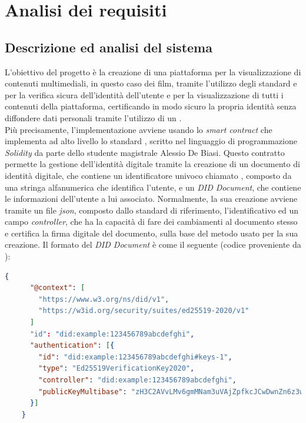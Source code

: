 \chapter{Analisi dei requisiti}
\label{cap:analisi-requisiti}


\section{Descrizione ed analisi del sistema}
L'obiettivo del progetto è la creazione di una piattaforma per la visualizzazione di contenuti multimediali, in questo caso dei film,
tramite l'utilizzo degli standard   e  per la verifica sicura dell'identità dell'utente e per la 
visualizzazione di tutti i contenuti della piattaforma, certificando in modo sicuro la propria identità senza diffondere dati personali tramite 
l'utilizzo di un .\\

Più precisamente, l'implementazione avviene usando lo \textit{smart contract} che implementa ad alto livello lo standard , 
scritto nel linguaggio di programmazione \textit{Solidity} da parte dello studente magistrale Alessio De Biasi.
Questo contratto permette la gestione dell'identità digitale tramite la creazione di un documento di identità digitale, che contiene un identificatore univoco
chiamato , composto da una stringa alfanumerica che identifica l'utente, e un \textit{DID Document}, che contiene le informazioni dell'utente a lui associato.
Normalmente, la sua creazione avviene tramite un file \textit{json}, composto dallo standard di riferimento, l'identificativo ed un campo \textit{controller},
che ha la capacità di fare dei cambiamenti al documento stesso e certifica la firma digitale del documento, sulla base del metodo usato per la sua creazione.
Il formato del \textit{DID Document} è come il seguente (codice proveniente da \cite{site:didw3c}):

\begin{lstlisting}[language=json]
    {
      "@context": [
        "https://www.w3.org/ns/did/v1",
        "https://w3id.org/security/suites/ed25519-2020/v1"
      ]
      "id": "did:example:123456789abcdefghi",
      "authentication": [{    
        "id": "did:example:123456789abcdefghi#keys-1",
        "type": "Ed25519VerificationKey2020",
        "controller": "did:example:123456789abcdefghi",
        "publicKeyMultibase": "zH3C2AVvLMv6gmMNam3uVAjZpfkcJCwDwnZn6z3wXmqPV"
      }]
    }
\end{lstlisting}

